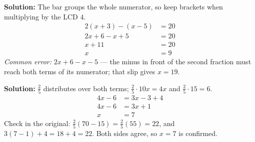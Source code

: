 \documentclass[12pt]{article}
\begin{document}
\textbf{Solution:} The bar groups the whole numerator, so keep brackets when multiplying by the
LCD $4$.
\begin{align*}
2(x + 3) - (x - 5) &= 20 \\
2x + 6 - x + 5 &= 20 \\
x + 11 &= 20 \\
x &= 9
\end{align*}
\emph{Common error:} $2x + 6 - x - 5$ --- the minus in front of the second fraction must reach both
terms of its numerator; that slip gives $x = 19$.

\textbf{Solution:} $\tfrac{2}{5}$ distributes over both terms; $\tfrac{2}{5} \cdot 10x = 4x$ and
$\tfrac{2}{5} \cdot 15 = 6$.
\begin{align*}
4x - 6 &= 3x - 3 + 4 \\
4x - 6 &= 3x + 1 \\
x &= 7
\end{align*}
Check in the original: $\tfrac{2}{5}(70 - 15) = \tfrac{2}{5}(55) = 22$, and
$3(7 - 1) + 4 = 18 + 4 = 22$. Both sides agree, so $x = 7$ is confirmed.
\end{document}
